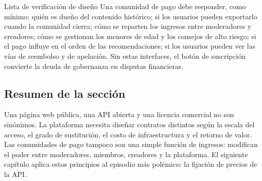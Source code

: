 \begin{importantbox}{Lista de verificación de diseño}
Una comunidad de pago debe responder, como mínimo: quién es dueño del contenido histórico; si los usuarios pueden exportarlo cuando la comunidad cierra; cómo se reparten los ingresos entre moderadores y creadores; cómo se gestionan los menores de edad y los consejos de alto riesgo; si el pago influye en el orden de las recomendaciones; si los usuarios pueden ver las vías de reembolso y de apelación. Sin estas interfaces, el botón de suscripción convierte la deuda de gobernanza en disputas financieras.
\end{importantbox}

\subsection{Resumen de la sección}

Una página web pública, una API abierta y una licencia comercial no son sinónimos. La plataforma necesita diseñar contratos distintos según la escala del acceso, el grado de sustitución, el costo de infraestructura y el retorno de valor. Las comunidades de pago tampoco son una simple función de ingresos: modifican el poder entre moderadores, miembros, creadores y la plataforma. El siguiente capítulo aplica estos principios al episodio más polémico: la fijación de precios de la API.
